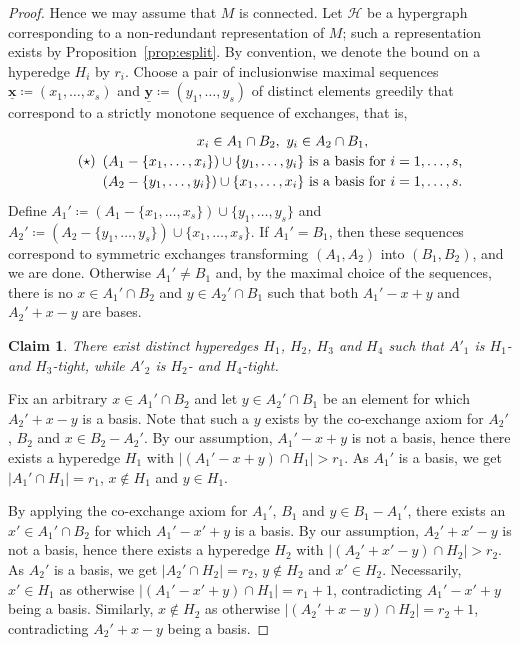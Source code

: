 \documentclass[11pt,a4paper]{article}
\theoremstyle{plain}
\newtheorem{cl}[thm]{Claim}
\theoremstyle{definition}
\newenvironment{claimproof}[1][\proofname]
  {%
    \proof[#1]%
      \renewcommand*\qedsymbol{$\bullet$}%
  }
  {%
    \endproof%
  }
\newcommand{\cH}{\mathcal{H}}
\newcommand{\ul}[1]{\underline{\mathbf{#1}}}
\begin{document}
\begin{proof}
Hence we may assume that $M$ is connected. Let $\cH$ be a hypergraph corresponding to a non-redundant representation of $M$; such a representation exists by Proposition~\ref{prop:esplit}. By convention, we denote the bound on a hyperedge $H_i$ by $r_i$. Choose a pair of inclusionwise maximal sequences $\ul{x}\coloneqq(x_1,\dots,x_s)$ and $\ul{y}\coloneqq(y_1,\dots,y_s)$ of distinct elements greedily that correspond to a strictly monotone sequence of exchanges, that is,
\begin{align*}
  \tag*{($\star$)}\label{star}
  \renewcommand{\arraystretch}{1.2}%
  \begin{array}{c}
x_i\in A_1\cap B_2,\ y_i\in A_2\cap B_1,\\ 
(A_1-\{x_1,\dots,x_i\})\cup\{y_1,\dots,y_i\}\ \text{is a basis for $i=1,\dots,s$,}\\
(A_2-\{y_1,\dots,y_i\})\cup\{x_1,\dots,x_i\}\ \text{is a basis for $i=1,\dots,s$.}
  \end{array}
\end{align*}
Define $A_1'\coloneqq (A_1-\{x_1,\dots,x_s\})\cup\{y_1,\dots,y_s\}$ and $A_2'\coloneqq (A_2-\{y_1,\dots,y_s\})\cup \{x_1,\dots,x_s\}$. If $A_1'=B_1$, then these sequences correspond to symmetric exchanges transforming $(A_1,A_2)$ into $(B_1,B_2)$, and we are done. Otherwise $A_1'\neq B_1$ and, by the maximal choice of the sequences, there is no $x\in A_1'\cap B_2$ and $y\in A_2'\cap B_1$ such that both $A_1'-x+y$ and $A_2'+x-y$ are bases.

\begin{cl}\label{cl:h}
There exist distinct hyperedges $H_1$, $H_2$, $H_3$ and $H_4$ such that $A'_1$ is $H_1$- and $H_3$-tight, while $A'_2$ is $H_2$- and $H_4$-tight.
\end{cl}
\begin{claimproof}
Fix an arbitrary $x\in A_1'\cap B_2$ and let $y\in A_2'\cap B_1$ be an element for which $A_2'+x-y$ is a basis. Note that such a $y$ exists by the co-exchange axiom for $A_2'$, $B_2$ and $x\in B_2-A_2'$. By our assumption, $A_1'-x+y$ is not a basis, hence there exists a hyperedge $H_1$ with $|(A_1'-x+y)\cap H_1|>r_1$. As $A_1'$ is a basis, we get $|A_1'\cap H_1|=r_1$, $x\notin H_1$ and $y\in H_1$. 

By applying the co-exchange axiom for $A_1'$, $B_1$ and $y\in B_1-A_1'$, there exists an $x'\in A_1'\cap B_2$ for which $A_1'-x'+y$ is a basis. By our assumption, $A_2'+x'-y$ is not a basis, hence there exists a hyperedge $H_2$ with $|(A_2'+x'-y)\cap H_2|>r_2$. As $A_2'$ is a basis, we get $|A_2'\cap H_2|=r_2$, $y\notin H_2$ and $x'\in H_2$. Necessarily, $x'\in H_1$ as otherwise $|(A_1'-x'+y)\cap H_1|=r_1+1$, contradicting $A_1'-x'+y$ being a basis. Similarly, $x\notin H_2$ as otherwise $|(A_2'+x-y)\cap H_2|=r_2+1$, contradicting $A_2'+x-y$ being a basis.


\end{claimproof}
\end{proof}
\end{document}
